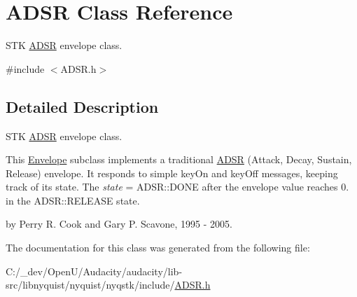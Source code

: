 \hypertarget{class_a_d_s_r}{}\section{A\+D\+SR Class Reference}
\label{class_a_d_s_r}


S\+TK \hyperlink{class_a_d_s_r}{A\+D\+SR} envelope class.  




{\ttfamily \#include $<$A\+D\+S\+R.\+h$>$}



\subsection{Detailed Description}
S\+TK \hyperlink{class_a_d_s_r}{A\+D\+SR} envelope class. 

This \hyperlink{class_envelope}{Envelope} subclass implements a traditional \hyperlink{class_a_d_s_r}{A\+D\+SR} (Attack, Decay, Sustain, Release) envelope. It responds to simple key\+On and key\+Off messages, keeping track of its state. The {\itshape state} = A\+D\+S\+R\+::\+D\+O\+NE after the envelope value reaches 0. in the A\+D\+S\+R\+::\+R\+E\+L\+E\+A\+SE state.

by Perry R. Cook and Gary P. Scavone, 1995 -\/ 2005. 

The documentation for this class was generated from the following file\+:\begin{DoxyCompactItemize}
\item 
C\+:/\+\_\+dev/\+Open\+U/\+Audacity/audacity/lib-\/src/libnyquist/nyquist/nyqstk/include/\hyperlink{_a_d_s_r_8h}{A\+D\+S\+R.\+h}\end{DoxyCompactItemize}
